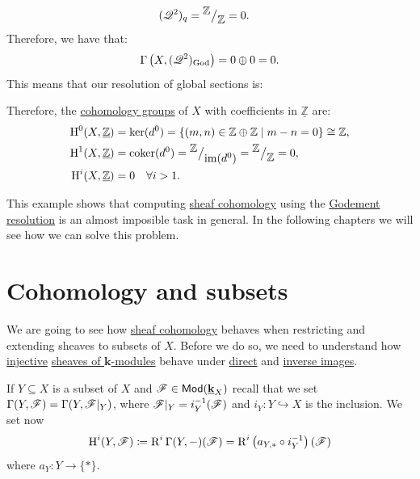 \documentclass[../../main]{subfiles}
\begin{document}
\begin{example}
\begin{align*}
    (\mathscr{Q}^2)_{q} &= {^{\textstyle \mathbb{Z}}\big/_{\textstyle \mathbb{Z}}} = 0.
  \end{align*}
  Therefore, we have that:
  \begin{equation*}
    \Gamma \left( X, (\mathscr{Q}^2)_{\operatorname{God}} \right) = 0 \oplus 0 = 0.
  \end{equation*}
  This means that our resolution of global sections is:
  \begin{center}
  \end{center}
  Therefore, the \hyperref[def:sheaf-cohomology]{cohomology groups} of \(X\) with coefficients in \(\underline{\mathbb{Z}}\) are:
  \begin{align*}
    \operatorname{H}^{0}(X, \underline{\mathbb{Z}}) &= \ker(d^{0}) = \{(m, n) \in \mathbb{Z} \oplus \mathbb{Z} \mid m - n = 0\} \cong \mathbb{Z}, \\
    \operatorname{H}^{1}(X, \underline{\mathbb{Z}}) &= \operatorname{coker}(d^{0}) = {^{\textstyle \mathbb{Z}}\big/_{\textstyle \operatorname{im}(d^{0})}} = {^{\textstyle \mathbb{Z}}\big/_{\textstyle \mathbb{Z}}} = 0, \\
    \operatorname{H}^{i}(X, \underline{\mathbb{Z}}) &= 0 \quad \forall i > 1.
  \end{align*}
\end{example}

This example shows that computing \hyperref[def:sheaf-cohomology]{sheaf cohomology} using the \hyperref[def:godement-resolution]{Godement resolution} is an almost imposible task in general.
In the following chapters we will see how we can solve this problem.

\section{Cohomology and subsets}
We are going to see how \hyperref[def:sheaf-cohomology]{sheaf cohomology} behaves when restricting and extending sheaves to subsets of \(X\).
Before we do so, we need to understand how \hyperref[def:injective-projective-object]{injective} \hyperref[def:sheaf]{sheaves of \(\mathbf{k}\)-modules} behave under \hyperref[def:direct-image-sheaf]{direct} and \hyperref[def:inverse-image-sheaf]{inverse images}.
\begin{notation}
  If \(Y \subseteq X\) is a subset of \(X\) and \(\mathscr{F} \in \mathsf{Mod}(\underline{\mathbf{k}}_{X})\) recall that we set \(\Gamma(Y, \mathscr{F}) = \Gamma(Y, \mathscr{F}|_{Y})\), where \(\mathscr{F}|_{Y} = i_{Y}^{-1}(\mathscr{F})\) and \(i_{Y}\colon Y \hookrightarrow X\) is the inclusion.
  We set now
  \begin{equation*}
    \operatorname{H}^{i}(Y, \mathscr{F}) \coloneq \operatorname{R}^{i}\Gamma(Y, -)(\mathscr{F}) = \operatorname{R}^{i}\left( a_{Y, \ast} \circ i_{Y}^{-1} \right) (\mathscr{F})
  \end{equation*}
  where \(a_{Y}\colon Y \to \{\ast\}\).
\end{notation}
\end{document}
